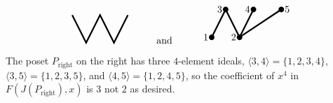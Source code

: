 \documentclass{article}
\newenvironment{solution}[1][Solution.]{\begin{trivlist}
\item[\hskip \labelsep {\bfseries #1}]}{\end{trivlist}}
\newcommand{\set}[1]{\{ #1 \}}
\newcommand{\ang}[1]{\langle #1 \rangle}
\begin{document}
\begin{solution}
\[\begin{tikzpicture}
      \draw[ultra thick] (-1/2,1)--(0,0)--(1/2,1)--(1,0)--(3/2,1);
    \end{tikzpicture}
    \hspace{1cm}\text{and}\hspace{1cm}
    \begin{tikzpicture}
      \fill (0,0) circle (0.1) node[left] {1};
      \fill (1,0) circle (0.1) node[left] {2};
      \fill (1/2,1) circle (0.1) node[left] {3};
      \fill (3/2,1) circle (0.1) node[left] {4};
      \fill (5/2,1) circle (0.1) node[right] {5};

      \draw[ultra thick] (0,0)--(1/2,1)--(1,0)--(3/2,1);
      \draw[ultra thick] (1,0)--(5/2,1);
    \end{tikzpicture}
  \]

  The poset $P_\text{right}$ on the right has three $4$-element ideals,
  $\ang{3, 4} = \set{1,2,3,4}$,
  $\ang{3, 5} = \set{1,2,3,5}$, and
  $\ang{4, 5} = \set{1,2,4,5}$,
  so the coefficient of $x^4$ in $F(J(P_\text{right}),x)$ is $3$ not $2$ as
  desired.


\end{solution}
\end{document}
